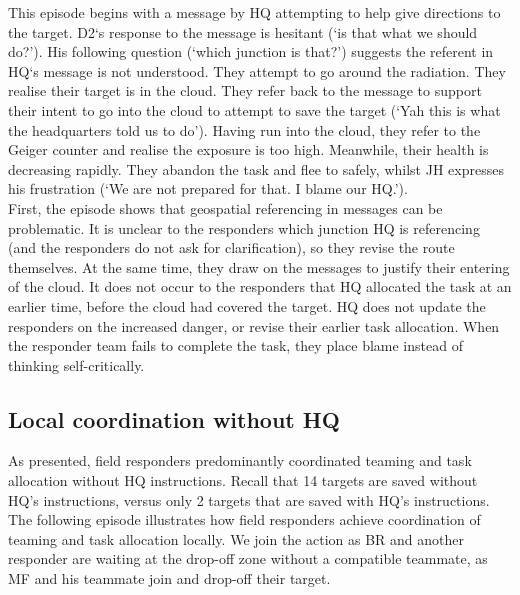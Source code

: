 This episode begins with a message by HQ attempting to help give directions to the target. D2`s response to the message is hesitant (`is that what we should do?'). His following question (`which junction is that?') suggests the referent in HQ`s message is not understood. They attempt to go around the radiation. They realise their target is in the cloud. They refer back to the message to support their intent to go into the cloud to attempt to save the target (`Yah this is what the headquarters told us to do'). Having run into the cloud, they refer to the Geiger counter and realise the exposure is too high. Meanwhile, their health is decreasing rapidly. They abandon the task and flee to safely, whilst JH expresses his frustration (`We are not prepared for that. I blame our HQ.').\\

First, the episode shows that geospatial referencing in messages can be problematic. It is unclear to the responders which junction HQ is referencing (and the responders do not ask for clarification), so they revise the route themselves. At the same time, they draw on the messages to justify their entering of the cloud. It does not occur to the responders that HQ allocated the task at an earlier time, before the cloud had covered the target. HQ does not update the responders on the increased danger, or revise their earlier task allocation. When the responder team fails to complete the task, they place blame instead of thinking self-critically.\\

\subsection{Local coordination without HQ}\label{sec:s1localcoordination}
As presented, field responders predominantly coordinated teaming and task allocation without HQ instructions. Recall that 14 targets are saved without HQ's instructions, versus only 2 targets that are saved with HQ's instructions. The following episode illustrates how field responders achieve coordination of teaming and task allocation locally. We join the action as BR and another responder are waiting at the drop-off zone without a compatible teammate, as MF and his teammate join and drop-off their target.\\

